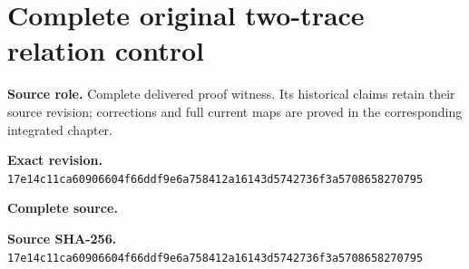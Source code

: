 \begingroup
\sloppy
\small
\clearpage
\section{Complete original two-trace relation control}
\noindent\textbf{Source role.} Complete delivered proof witness. Its historical claims retain their source revision; corrections and full current maps are proved in the corresponding integrated chapter.\par
\noindent\textbf{Exact revision.} \nolinkurl{17e14c11ca60906604f66ddf9e6a758412a16143d5742736f3a5708658270795}\par
\noindent\textbf{Complete source.} \par
\noindent\textbf{Source SHA-256.} \nolinkurl{17e14c11ca60906604f66ddf9e6a758412a16143d5742736f3a5708658270795}\par\medskip

\endgroup
